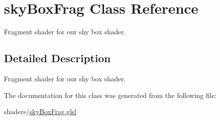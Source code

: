 \hypertarget{classsky_box_frag}{\section{sky\-Box\-Frag Class Reference}
\label{classsky_box_frag}
}


Fragment shader for our shy box shader.  




\subsection{Detailed Description}
Fragment shader for our shy box shader. 

The documentation for this class was generated from the following file\-:\begin{DoxyCompactItemize}
\item 
shaders/\hyperlink{sky_box_frag_8glsl}{sky\-Box\-Frag.\-glsl}\end{DoxyCompactItemize}
